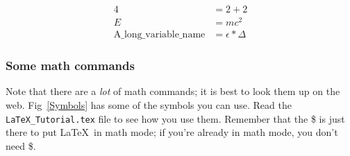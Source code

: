 \documentclass[letterpaper]{article}
\begin{document}
\begin{align}
4 & = 2 + 2 \\
E & = mc^{2} \\
\text{A\_long\_variable\_name} & = \epsilon * \Delta 
\end{align}

\subsubsection{Some math commands}

Note that there are a \emph{lot} of math commands; it is best to look 
them up on the web.  Fig~\ref{Symbols} has some of the symbols you can 
use. Read the \verb+LaTeX_Tutorial.tex+ file to see how you use them.  
Remember that the \$ is just there to put \LaTeX\ in math mode; if 
you're already in math mode, you don't need \$.
\end{document}
